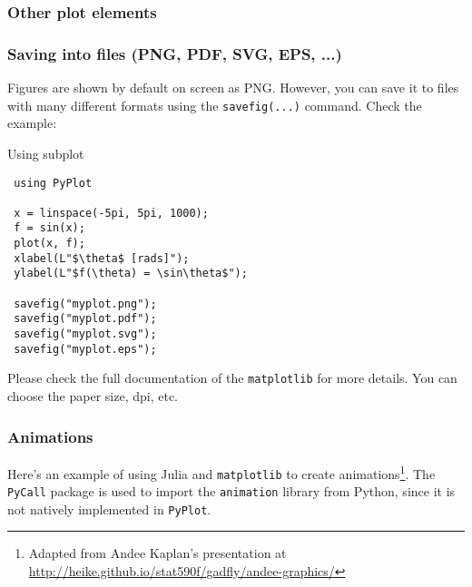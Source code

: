\subsubsection{Other plot elements}


\subsubsection{Saving into files (PNG, PDF, SVG, EPS, ...)}

Figures are shown by default on screen as PNG. However, you can save it to files with many different formats using the \texttt{savefig(...)} command. Check the example:

\begin{example}{Using subplot}
\begin{verbatim}
 using PyPlot
 
 x = linspace(-5pi, 5pi, 1000);
 f = sin(x);
 plot(x, f);
 xlabel(L"$\theta$ [rads]");
 ylabel(L"$f(\theta) = \sin\theta$");
 
 savefig("myplot.png");
 savefig("myplot.pdf");
 savefig("myplot.svg");
 savefig("myplot.eps");
\end{verbatim}
\end{example}

Please check the full documentation of the \texttt{matplotlib} for more details. You can choose the paper size, dpi, etc.

\subsubsection{Animations}

Here's an example of using Julia and \texttt{matplotlib} to create animations\footnote{Adapted from Andee Kaplan's presentation at \url{http://heike.github.io/stat590f/gadfly/andee-graphics/}}. The \texttt{PyCall} package is used to import the \texttt{animation} library from Python, since it is not natively implemented in \texttt{PyPlot}.

